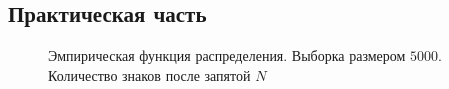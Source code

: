 \documentclass[12pt, a4paper]{article}
\begin{document}
\subsection{Практическая часть}
\begin{figure}[H]
\caption{Эмпирическая функция распределения. Выборка размером $5000$. Количество знаков после запятой $N$}
\end{figure}
\end{document}
